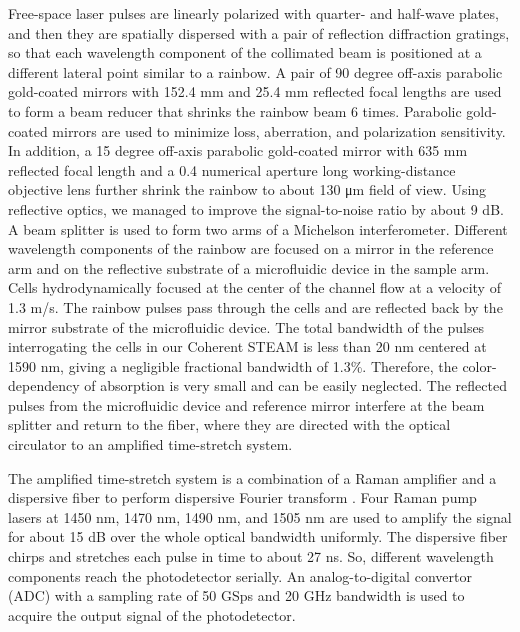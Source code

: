 Free-space laser pulses are linearly polarized with quarter- and half-wave plates, and then they are spatially dispersed with a pair of reflection diffraction gratings, so that each wavelength component of the collimated beam is positioned at a different lateral point similar to a rainbow. A pair of 90 degree off-axis parabolic gold-coated mirrors with 152.4 mm and 25.4 mm reflected focal lengths are used to form a beam reducer that shrinks the rainbow beam 6 times. Parabolic gold-coated mirrors are used to minimize loss, aberration, and polarization sensitivity. In addition, a 15 degree off-axis parabolic gold-coated mirror with 635 mm reflected focal length and a 0.4 numerical aperture long working-distance objective lens further shrink the rainbow to about 130 μm field of view. Using reflective optics, we managed to improve the signal-to-noise ratio by about 9 dB. A beam splitter is used to form two arms of a Michelson interferometer. Different wavelength components of the rainbow are focused on a mirror in the reference arm and on the reflective substrate of a microfluidic device in the sample arm. Cells hydrodynamically focused at the center of the channel flow at a velocity of 1.3 m/s. The rainbow pulses pass through the cells and are reflected back by the mirror substrate of the microfluidic device. The total bandwidth of the pulses interrogating the cells in our Coherent STEAM is less than 20 nm centered at 1590 nm, giving a negligible fractional bandwidth of 1.3\%. Therefore, the color-dependency of absorption is very small and can be easily neglected. The reflected pulses from the microfluidic device and reference mirror interfere at the beam splitter and return to the fiber, where they are directed with the optical circulator to an amplified time-stretch system.

The amplified time-stretch system is a combination of a Raman amplifier and a dispersive fiber to perform dispersive Fourier transform \cite{goda2013dispersive}. Four Raman pump lasers at 1450 nm, 1470 nm, 1490 nm, and 1505 nm are used to amplify the signal for about 15 dB over the whole optical bandwidth uniformly. The dispersive fiber chirps and stretches each pulse in time to about 27 ns. So, different wavelength components reach the photodetector serially. An analog-to-digital convertor (ADC) with a sampling rate of 50 GSps and 20 GHz bandwidth is used to acquire the output signal of the photodetector.

